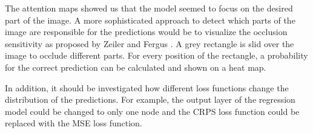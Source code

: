\documentclass[12pt]{article}
\begin{document}
The attention maps showed us that the model seemed to focus on the desired part of the image. A more sophisticated approach to detect which parts of the image are responsible for the predictions would be to visualize the occlusion sensitivity as proposed by Zeiler and Fergus \cite{zeiler_2013}. A grey rectangle is slid over the image to occlude different parts. For every position of the rectangle, a probability for the correct prediction can be calculated and shown on a heat map. 

In addition, it should be investigated how different loss functions change the distribution of the predictions. For example, the output layer of the regression model could be changed to only one node and the CRPS loss function could be replaced with the MSE loss function.

\newpage
\printbibliography

\newpage
\listoffigures

\newpage
\listoftables
\end{document}
